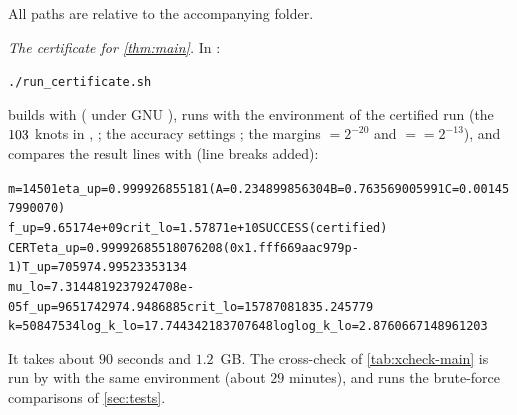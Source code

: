 All paths are relative to the accompanying folder.

\emph{The certificate for \cref{thm:main}.} In :
\begin{alltt}\footnotesize
./run_certificate.sh
\end{alltt}
builds  with  ( under GNU ),
runs  with
the environment of the certified run (the $103$ knots in , ; the accuracy
settings ; the margins $=2^{-20}$
and $=$$=2^{-13}$), and compares the result lines with 
(line breaks added):
\begin{alltt}\footnotesize
m=14501 eta_up=0.999926855181 (A=0.234899856304 B=0.763569005991 C=0.001457990070)
  f_up=9.65174e+09 crit_lo=1.57871e+10 SUCCESS(certified)
CERT eta_up=0.99992685518076208 (0x1.fff669aac979p-1) T_up=705974.99523353134
  mu_lo=7.3144819237924708e-05 f_up=9651742974.9486885 crit_lo=15787081835.245779
  k=50847534 log_k_lo=17.744342183707648 loglog_k_lo=2.8760667148961203
\end{alltt}
It takes about $90$ seconds and $1.2$~GB. The cross-check of \cref{tab:xcheck-main} is run by
 with the same environment (about $29$ minutes), and  runs
the brute-force comparisons of \cref{sec:tests}.

